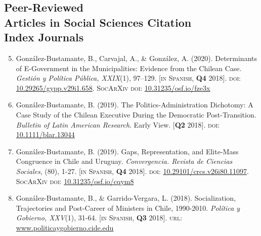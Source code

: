 \documentclass[letterpaper,margin]{res}
\newenvironment{benumerate}[1]{
    \let\oldItem\item
    \def\item{\addtocounter{enumi}{-2}\oldItem}
    \begin{enumerate}
    \setcounter{enumi}{#1}
    \addtocounter{enumi}{1}
}{
    \end{enumerate}
}
\begin{document}
\begin{resume}

\section{\footnotesize Peer-Reviewed \\ Articles in Social Sciences Citation \\ Index Journals}

\begin{benumerate}{4}
\item{\small Gonz\'alez-Bustamante, B., Carvajal, A., \& Gonz\'alez, A. (2020). Determinants of E-Government in the Municipalities: Evidence from the Chilean Case. {\itshape Gesti\'on y Pol\'itica P\'ublica, XXIX}(1), 97--129. {\footnotesize \scshape [in Spanish, {\bfseries \small Q4} 2018]}. {\scshape doi:} \href{http://dx.doi.org/10.29265/gypp.v29i1.658}{10.29265/gypp.v29i1.658}. {\scshape {\footnotesize SocArXiv} doi}: \href{https://doi.org/10.31235/osf.io/fze3x}{10.31235/osf.io/fze3x}}\vspace{1mm}

\item{\small Gonz\'alez-Bustamante, B. (2019). The Politics-Administration Dichotomy: A Case Study of the Chilean Executive During the Democratic Post-Transition. {\itshape Bulletin of Latin American Research}. Early View. {\footnotesize \scshape [{\bfseries \small Q2} 2018]}. {\scshape doi}: \href{https://doi.org/10.1111/blar.13044}{10.1111/blar.13044}}\vspace{1mm}

\item{\small Gonz\'alez-Bustamante, B. (2019). Gaps, Representation, and Elite-Mass Congruence in Chile and Uruguay. {\itshape Convergencia. Revista de Ciencias Sociales}, (80), 1-27. {\footnotesize \scshape [in Spanish, {\bfseries \small Q4} 2018]}. {\scshape doi}: \href{https://doi.org/10.29101/crcs.v26i80.11097}{10.29101/crcs.v26i80.11097}. {\scshape {\footnotesize SocArXiv} doi}: \href{https://doi.org/10.31235/osf.io/cqym8}{10.31235/osf.io/cqym8}}\vspace{1mm}

\item{\small Gonz\'alez-Bustamante, B., \& Garrido-Vergara, L. (2018). Socialization, Trajectories and Post-Career of Ministers in Chile, 1990-2010. {\itshape Pol\'itica y Gobierno, XXV}(1), 31-64. {\footnotesize \scshape [in Spanish, {\bfseries \small Q3} 2018]}. {\scshape url}: \href{http://www.politicaygobierno.cide.edu/index.php/pyg/article/view/1080}{www.politicaygobierno.cide.edu}}
\end{benumerate}


\end{resume}
\end{document}
